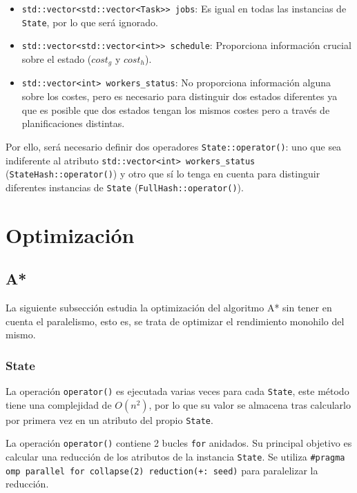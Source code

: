 \begin{itemize}[itemsep=0.25px]
    \item \lstinline{std::vector<std::vector<Task>> jobs}: Es igual en todas las
    instancias de \lstinline{State}, por lo que será ignorado.
    \item \lstinline{std::vector<std::vector<int>> schedule}: Proporciona
    información crucial sobre el estado ($cost_g$ y $cost_h$).
    \item \lstinline{std::vector<int> workers_status}: No proporciona
    información alguna sobre los costes,
    pero es necesario para distinguir dos estados diferentes
    ya que es posible que dos estados tengan los mismos costes pero a través de
    planificaciones distintas.
\end{itemize}

Por ello, será necesario definir dos operadores \lstinline{State::operator()}:
uno que sea indiferente al atributo \lstinline{std::vector<int> workers_status}
(\lstinline{StateHash::operator()})
y otro que sí lo tenga en cuenta para distinguir diferentes instancias de \lstinline{State}
(\lstinline{FullHash::operator()}).

\section{Optimización}

\subsection{A*}

La siguiente subsección estudia la optimización
del algoritmo A* sin tener en cuenta el paralelismo,
esto es, se trata de optimizar el rendimiento
monohilo del mismo.

\subsubsection{State}

La operación \lstinline{operator()} es ejecutada varias veces para cada
\lstinline{State}, este método tiene una complejidad de $O(n^2)$,
por lo que su valor se almacena tras calcularlo por primera vez
en un atributo del propio \lstinline{State}.

La operación \lstinline{operator()} contiene 2 bucles \lstinline{for} anidados.
Su principal objetivo es calcular una reducción de los atributos de la instancia
\lstinline{State}.
Se utiliza \lstinline{#pragma omp parallel for collapse(2) reduction(+: seed)}
para paralelizar la reducción.

